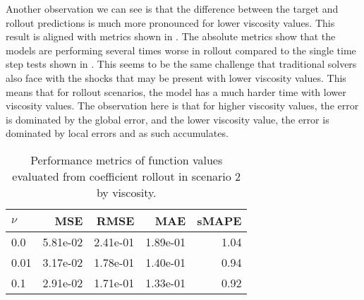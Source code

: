 \documentclass[preprint,12pt,times,authoryear]{elsarticle}
\begin{document}
Another observation we can see is that the difference between the target and rollout predictions is much more pronounced for lower viscosity values. This result is aligned with metrics shown in . The absolute metrics show that the models are performing several times worse in rollout compared to the single time step tests shown in . This seems to be the same challenge that traditional solvers also face with the shocks that may be present with lower viscosity values. This means that for rollout scenarios, the model has a much harder time with lower viscosity values. The observation here is that for higher viscosity values, the error is dominated by the global error, and the lower viscosity value, the error is dominated by local errors and as such accumulates.
\begin{table}[H]
  \caption{Performance metrics of function values evaluated from coefficient rollout in scenario 2 by viscosity.}\label{table:scenario_2_rollout_function_metrics}
  \centering
  \begin{tabular}{lrrrr}
    \toprule
    \(\nu \) & MSE      & RMSE     & MAE      & sMAPE \\
    \midrule
    0.0      & 5.81e-02 & 2.41e-01 & 1.89e-01 & 1.04  \\
    0.01     & 3.17e-02 & 1.78e-01 & 1.40e-01 & 0.94  \\
    0.1      & 2.91e-02 & 1.71e-01 & 1.33e-01 & 0.92  \\
    \bottomrule
  \end{tabular}
\end{table}
\end{document}
